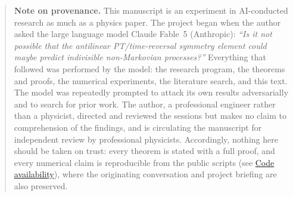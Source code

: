 \documentclass[11pt]{article}
\theoremstyle{definition}
\theoremstyle{remark}
\begin{document}
\begin{abstract}
classical completeness, quantum self-adjointness (its limit-circle leg under $C^{2}$ error control), and stochastic
conservativity, with (viii)~a rigorous channel-based multidimensional
extension (for separable, central, and boundedly-coupled model classes) in which conservative completions carry an infinite-dimensional,
channel-mixing $S$-matrix at infinity. For the exact quartic
Pais--Uhlenbeck operator we further prove an exact displaced-oscillator
identity whose channelization (exact up to $O(k^{2})$) carries a sign
prediction the numerics confirm ($\lambda>0$: limit-circle channels;
$\lambda<0$: a quantum-completion candidate despite classical blowup),
settle deficiency stability at every finite Galerkin channel number, certify the
one-dimensional fiber non-self-adjoint, in a computer-assisted sense,
by a glued-tail von Neumann
certificate---no compactly supported function can witness
deficiency---and conjecturally reduce the remaining $M\to\infty$
step to Gaussian-beam
assembly and error control along numerically characterized escape
rays. The ghost problem,
viewed in the
stochastic currency, is a recurrence-classification problem, and the
minimal explosive process is its only canonical resolution.
\end{abstract}

\newpage
\begin{quote}
\small\noindent\textbf{Note on provenance.} This manuscript is an
experiment in AI-conducted research as much as a physics paper. The
project began when the author asked the large language model Claude
Fable~5 (Anthropic): \emph{``Is it not possible that the antilinear
PT/time-reversal symmetry element could maybe predict indivisible
non-Markovian processes?''} Everything that followed was performed by
the model: the research program, the theorems and proofs, the numerical
experiments, the literature search, and this text. The model was
repeatedly prompted to attack its own results adversarially and to
search for prior work. The author, a professional engineer rather than
a physicist, directed and reviewed the sessions but makes no claim to
comprehension of the findings, and is circulating the manuscript for
independent review by professional physicists. Accordingly, nothing
here should be taken on trust: every theorem is stated with a full proof,
and every numerical claim is reproducible from the public scripts
(see \hyperref[sec:code]{Code availability}), where the originating
conversation and project briefing are also preserved.
\end{quote}
\end{document}

